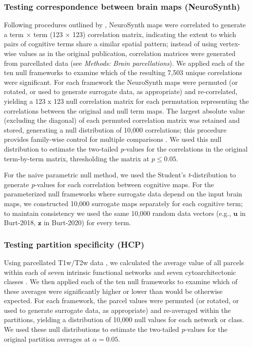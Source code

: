 \documentclass[12pt,aps,pra,reprint,showkeys]{revtex4-1}
\begin{document}
\subsubsection*{Testing correspondence between brain maps (NeuroSynth)}

Following procedures outlined by \citet{alexanderbloch2018neuroimage}, NeuroSynth maps were correlated to generate a term $\times$ term (123 $\times$ 123) correlation matrix, indicating the extent to which pairs of cognitive terms share a similar spatial pattern; instead of using vertex-wise values as in the original publication, correlation matrices were generated from parcellated data (see \textit{Methods: Brain parcellations}).
We applied each of the ten null frameworks to examine which of the resulting 7,503 unique correlations were significant.
For each framework the NeuroSynth maps were permuted (or rotated, or used to generate surrogate data, as appropriate) and re-correlated, yielding a 123 x 123 null correlation matrix  for each permutation representing the correlations between the original and null term maps.
The largest absolute value (excluding the diagonal) of each permuted correlation matrix was retained and stored, generating a null distribution of 10,000 correlations; this procedure provides family-wise control for multiple comparisons \citep{alexanderbloch2018neuroimage, westfall1993resampling}.
We used this null distribution to estimate the two-tailed \emph{p}-values for the correlations in the original term-by-term matrix, thresholding the matrix at $p \leq 0.05$.

For the naive parametric null method, we used the Student's \emph{t}-distribution to generate \emph{p}-values for each correlation between cognitive maps.
For the parameterized null frameworks where surrogate data depend on the input brain maps, we constructed 10,000 surrogate maps separately for each cognitive term; to maintain consistency we used the same 10,000 random data vectors (e.g., $\mathbf{u}$ in Burt-2018, $\mathbf{z}$ in Burt-2020) for every term.

\subsubsection*{Testing partition specificity (HCP)}

Using parcellated T1w/T2w data \citep{vanessen2013neuroimage}, we calculated the average value of all parcels within each of seven intrinsic functional networks \citep{yeo2011organization} and seven cytoarchitectonic classes \citep{voneconomo1925cytoarchitecture, scholtens2018neuroimage}.
We then applied each of the ten null frameworks to examine which of these averages were significantly higher or lower than would be otherwise expected.
For each framework, the parcel values were permuted (or rotated, or used to generate surrogate data, as appropriate) and re-averaged within the partitions, yielding a distribution of 10,000 null values for each network or class.
We used these null distributions to estimate the two-tailed \emph{p}-values for the original partition averages at $\alpha = 0.05$.
\end{document}
